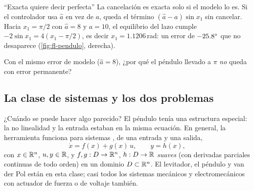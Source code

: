 
\begin{trampa}[label=tr:fl-robusta]{``Exacta quiere decir perfecta''}
La cancelación es exacta solo si el modelo lo es. Si el controlador usa $\hat a$ en vez de $a$, queda el término $(\hat a-a)\sin x_1$ sin cancelar. Hacia $x_1=\pi/2$ con $\hat a=8$ y $a=10$, el equilibrio del lazo cumple $-2\sin x_1=4(x_1-\pi/2)$, es decir $x_1=1.1206$\,rad: un error de $-25.8^{\circ}$ que no desaparece (\cref{fig:fl-pendulo}, derecha).
\end{trampa}


\begin{pausa}
Con el mismo error de modelo ($\hat a=8$), ¿por qué el péndulo llevado a $\pi$ \emph{no} queda con error permanente?
\end{pausa}

\subsection{La clase de sistemas y los dos problemas}

¿Cuándo se puede hacer algo parecido? El péndulo tenía una estructura especial: la no linealidad y la entrada estaban en la misma ecuación. En general, la herramienta funciona para sistemas , de una entrada y una salida,
\begin{equation}
  \dot x=f(x)+g(x)\,u,\qquad y=h(x),
  \label{eq:fl-afin}
\end{equation}
con $x\in\mathbb{R}^n$, $u,y\in\mathbb{R}$, y $f,g:D\to\mathbb{R}^n$, $h:D\to\mathbb{R}$ \emph{suaves} (con derivadas parciales continuas de todo orden) en un dominio $D\subset\mathbb{R}^n$. El levitador, el péndulo y van der Pol están en esta clase; casi todos los sistemas mecánicos y electromecánicos con actuador de fuerza o de voltaje también.

